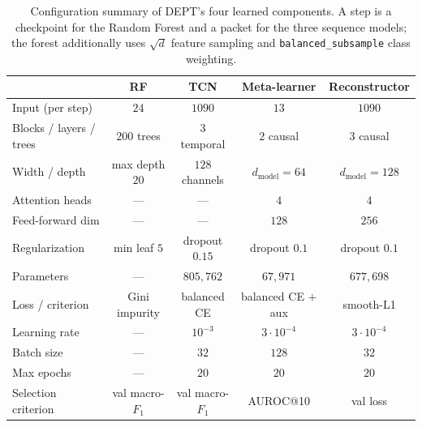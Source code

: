 \begin{table}[htbp]
    \centering
    \caption[Model configuration summary.]{Configuration summary of DEPT's four
    learned components. A step is a checkpoint for the Random Forest and a packet for
    the three sequence models; the forest additionally uses $\sqrt{d}$ feature sampling
    and \texttt{balanced\_subsample} class weighting.}
    \label{tab:sol-hyper}
    \begin{tabular}{@{}lcccc@{}}
        \toprule
         & \textbf{RF} & \textbf{TCN} & \textbf{Meta-learner} & \textbf{Reconstructor} \\
        \midrule
        Input (per step)        & $24$            & $1090$          & $13$            & $1090$ \\
        Blocks / layers / trees & $200$ trees     & $3$ temporal    & $2$ causal      & $3$ causal \\
        Width / depth           & max depth $20$  & $128$ channels  & $d_{\text{model}}=64$ & $d_{\text{model}}=128$ \\
        Attention heads         & ---             & ---             & $4$             & $4$ \\
        Feed-forward dim        & ---             & ---             & $128$           & $256$ \\
        Regularization          & min leaf $5$    & dropout $0.15$  & dropout $0.1$   & dropout $0.1$ \\
        Parameters              & ---             & $805{,}762$     & $67{,}971$      & $677{,}698$ \\
        \midrule
        Loss / criterion        & Gini impurity   & balanced CE     & balanced CE $+$ aux & smooth-L1 \\
        Learning rate           & ---             & $10^{-3}$       & $3\cdot10^{-4}$ & $3\cdot10^{-4}$ \\
        Batch size              & ---             & $32$            & $128$           & $32$ \\
        Max epochs              & ---             & $20$            & $20$            & $20$ \\
        Selection criterion     & val macro-$F_1$ & val macro-$F_1$ & AUROC@10        & val loss \\
        \bottomrule
    \end{tabular}
\end{table}

